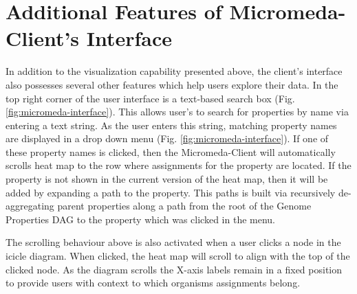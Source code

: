 \section{Additional Features of Micromeda-Client's Interface}

In addition to the visualization capability presented above, the client's interface also possesses several other features which help users explore their data. In the top right corner of the user interface is a text-based search box (Fig. \ref{fig:micromeda-interface}). This allows user's to search for properties by name via entering a text string. As the user enters this string, matching property names are displayed in a drop down menu (Fig. \ref{fig:micromeda-interface}). If one of these property names is clicked, then the Micromeda-Client will automatically scrolls heat map to the row where assignments for the property are located. If the property is not shown in the current version of the heat map, then it will be added by expanding a path to the property. This paths is built via recursively de-aggregating parent properties along a path from the root of the Genome Properties DAG to the property which was clicked in the menu.

The scrolling behaviour above is also activated when a user clicks a node in the icicle diagram. When clicked, the heat map will scroll to align with the top of the clicked node. As the diagram scrolls the X-axis labels remain in a fixed position to provide users with context to which organisms assignments belong. 


